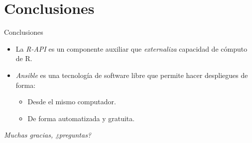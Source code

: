 \documentclass[12pt, aspectratio=169]{beamer} %
\begin{document}
\section{Conclusiones}
\begin{frame}{Conclusiones}
  \begin{itemize}
  \item La \textit{R-API} es un componente auxiliar que \textit{externaliza} capacidad de cómputo de R.
  \item \textit{Ansible} es una tecnología de software libre que permite hacer despliegues de forma:
    \begin{itemize}
    \item Desde el mismo computador.
    \item De forma automatizada y gratuita.
    \end{itemize}

  \end{itemize}
\end{frame}

\begin{frame}{}
  \centering \Large
  \emph{Muchas gracias, ¿preguntas?}
\end{frame}
\end{document}

